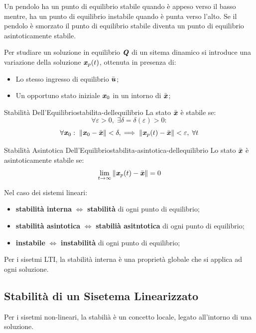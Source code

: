 \documentclass[12pt]{article}
\begin{document}
Un pendolo ha un punto di equilibrio stabile quando \`e appeso verso il basso mentre, ha un punto di equilibrio instabile quando \`e punta verso l'alto. Se il pendolo \`e smorzato il punto di equilibrio stabile diventa un punto di equilibrio asintoticamente stabile.

Per studiare un soluzione in equilibrio $\textbf{\textit{Q}}$ di un sitema dinamico si introduce una variazione della soluzione $\textbf{\textit{x}}_p(t)$, ottenuta in presenza di:
\begin{itemize}
    \item Lo stesso ingresso di equilibrio $\bar{\textbf{\textit{u}}}$;
    \item Un opportuno stato iniziale $\textbf{\textit{x}}_0$ in un intorno di $\bar{\textbf{\textit{x}}}$;
\end{itemize}

\begin{definition}{Stabilit\`a Dell'Equilibrio}{stabilita-dellequilibrio}
    La stato $\bar{\textbf{\textit{x}}}$ \`e stabile se:
    \[ \forall \varepsilon > 0, \;\exists \delta = \delta(\varepsilon) > 0: \]
    \[ \forall \textbf{\textit{x}}_0: \;\| \textbf{\textit{x}}_0 - \bar{\textbf{\textit{x}}} \| < \delta, \implies \| \textbf{\textit{x}}_p(t) - \bar{\textbf{\textit{x}}} \| < \varepsilon, \;\forall t\]
\end{definition}

\begin{definition}{Stabilit\`a Asintotica Dell'Equilibrio}{stabilita-asintotica-dellequilibrio}
    Lo stato $\bar{\textbf{\textit{x}}}$ \`e asintoticamente stabile se:
    \[ \lim_{t \to \infty} \| \textbf{\textit{x}}_p(t) - \bar{\textbf{\textit{x}}} \| = 0 \]
\end{definition}

Nel caso dei sistemi lineari:
\begin{itemize}
    \item \textbf{stabilit\`a interna} $\iff$ \textbf{stabilit\`a} di ogni punto di equilibrio;
    \item \textbf{stabilit\`a asintotica} $\iff$ \textbf{stabili\`a asitntotica} di ogni punto di equilibrio;
    \item \textbf{instabile} $\iff$ \textbf{instabilit\`a} di ogni punto di equilibrio;
\end{itemize}

Per i sisetmi LTI, la stabilit\`a interna \`e una propriet\`a globale che si applica ad ogni soluzione.


\subsection{Stabilit\`a di un Sisetema Linearizzato}
Per i sisetmi non-lineari, la stabili\`a \`e un concetto locale, legato all'intorno di una soluzione.
\end{document}
